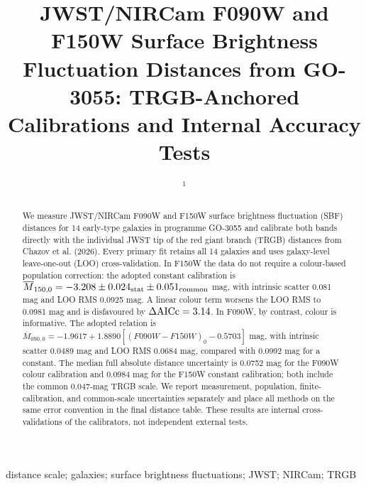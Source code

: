 \documentclass[nodoi,nocopyright]{pas}
\newcommand{\Mbar}{\overline{M}}
\begin{document}
\renewcommand{\doitext}{}
\title{JWST/NIRCam F090W and F150W Surface Brightness Fluctuation Distances
from GO-3055: TRGB-Anchored Calibrations and Internal Accuracy Tests}
\author{ $^1$}

\begin{abstract}
We measure JWST/NIRCam F090W and F150W surface brightness fluctuation (SBF)
distances for 14 early-type galaxies in programme GO-3055 and calibrate both
bands directly with the individual JWST tip of the red giant branch (TRGB)
distances from Chazov et al. (2026).  Every primary fit retains all 14
galaxies and uses galaxy-level leave-one-out (LOO) cross-validation.  In
F150W the data do not require a colour-based population correction: the adopted constant
calibration is
$\Mbar_{150,0}=-3.208\pm0.024_{\rm stat}\pm0.051_{\rm common}$ mag, with
intrinsic scatter 0.081 mag and LOO RMS 0.0925 mag.
A linear colour term worsens the LOO RMS to 0.0981 mag and is disfavoured by
$\Delta{\rm AICc}=3.14$.  In F090W, by contrast, colour is informative.  The
adopted relation is
$\Mbar_{090,0}=-1.9617+1.8890[(F090W-F150W)_0-0.5703]$ mag, with intrinsic
scatter 0.0489 mag and LOO RMS 0.0684 mag, compared with 0.0992 mag for a
constant.  The median full absolute distance uncertainty is 0.0752 mag for
the F090W colour calibration and 0.0984 mag for the F150W constant
calibration; both include the common 0.047-mag TRGB scale.  We report
measurement, population, finite-calibration, and common-scale uncertainties
separately and place all methods on the same error convention in the final
distance table.  These results are internal cross-validations of the
calibrators, not independent external tests.
\end{abstract}

\begin{keywords}
distance scale; galaxies; surface brightness fluctuations; JWST; NIRCam; TRGB
\end{keywords}
\maketitle\endgroup
\end{document}

